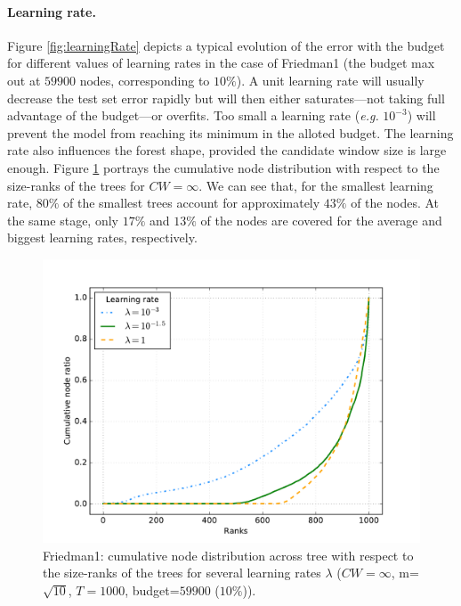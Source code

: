 \documentclass{article}
\begin{document}
\paragraph{Learning rate.}
Figure \ref{fig:learningRate} depicts a typical evolution of the error with the 
budget for different values of learning rates in the case of Friedman1 (the 
budget max out at $59900$ nodes, corresponding to $10\%$). A unit learning rate 
will usually decrease the test set error rapidly but will then either 
saturates---not taking full advantage of the budget---or overfits. 
Too small a learning rate ({\it e.g.} $10^{-3}$) will prevent the model from 
reaching its minimum in the alloted budget.  The learning rate also influences 
the forest shape, provided the candidate window size is large enough. 
Figure \ref{fig:LRShape} portrays the cumulative node distribution with respect 
to the size-ranks of the trees for $CW=\infty$. We can see that, for the 
smallest learning rate,  $80\%$ of the smallest trees account for approximately 
$43\%$ of the nodes. At the same stage, only $17\%$ and $13\%$ of the nodes are 
covered for the average and biggest learning rates, respectively. 


\begin{figure}[ht]
\begin{center}
\centerline{\includegraphics[width=\columnwidth]{friedman1_cumul}}
\caption{Friedman1: cumulative node distribution across tree with respect to 
the size-ranks of the trees for several learning rates $\lambda$ ($CW=\infty$, 
m=$\sqrt{10}$, $T=1000$, budget=$59900$ ($10\%$)).}
\label{fig:LRShape}
\end{center}
\vskip -0.2in
\end{figure} 
\end{document}
